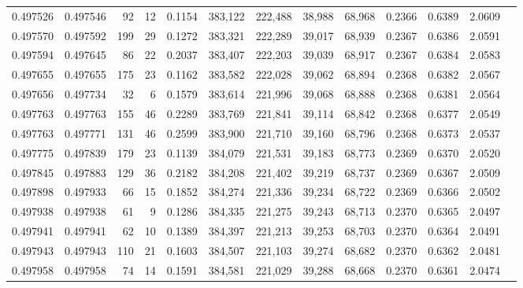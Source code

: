 \begin{tabular}{rrrrrrrrrrrrr}
0.497526 & 0.497546 &    92 &    12 &                                     0.1154 & 383,122 & 222,488 &  38,988 &  68,968 & 0.2366 & 0.6389 & 2.0609 \\
0.497570 & 0.497592 &   199 &    29 &                                     0.1272 & 383,321 & 222,289 &  39,017 &  68,939 & 0.2367 & 0.6386 & 2.0591 \\
0.497594 & 0.497645 &    86 &    22 &                                     0.2037 & 383,407 & 222,203 &  39,039 &  68,917 & 0.2367 & 0.6384 & 2.0583 \\
0.497655 & 0.497655 &   175 &    23 &                                     0.1162 & 383,582 & 222,028 &  39,062 &  68,894 & 0.2368 & 0.6382 & 2.0567 \\
0.497656 & 0.497734 &    32 &     6 &                                     0.1579 & 383,614 & 221,996 &  39,068 &  68,888 & 0.2368 & 0.6381 & 2.0564 \\
0.497763 & 0.497763 &   155 &    46 &                                     0.2289 & 383,769 & 221,841 &  39,114 &  68,842 & 0.2368 & 0.6377 & 2.0549 \\
0.497763 & 0.497771 &   131 &    46 &                                     0.2599 & 383,900 & 221,710 &  39,160 &  68,796 & 0.2368 & 0.6373 & 2.0537 \\
0.497775 & 0.497839 &   179 &    23 &                                     0.1139 & 384,079 & 221,531 &  39,183 &  68,773 & 0.2369 & 0.6370 & 2.0520 \\
0.497845 & 0.497883 &   129 &    36 &                                     0.2182 & 384,208 & 221,402 &  39,219 &  68,737 & 0.2369 & 0.6367 & 2.0509 \\
0.497898 & 0.497933 &    66 &    15 &                                     0.1852 & 384,274 & 221,336 &  39,234 &  68,722 & 0.2369 & 0.6366 & 2.0502 \\
0.497938 & 0.497938 &    61 &     9 &                                     0.1286 & 384,335 & 221,275 &  39,243 &  68,713 & 0.2370 & 0.6365 & 2.0497 \\
0.497941 & 0.497941 &    62 &    10 &                                     0.1389 & 384,397 & 221,213 &  39,253 &  68,703 & 0.2370 & 0.6364 & 2.0491 \\
0.497943 & 0.497943 &   110 &    21 &                                     0.1603 & 384,507 & 221,103 &  39,274 &  68,682 & 0.2370 & 0.6362 & 2.0481 \\
0.497958 & 0.497958 &    74 &    14 &                                     0.1591 & 384,581 & 221,029 &  39,288 &  68,668 & 0.2370 & 0.6361 & 2.0474 \\

\end{tabular}
